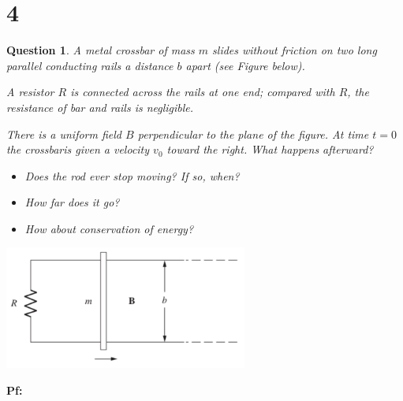 \documentclass{article}
\newtheorem{question}{Question}
\begin{document}
\section*{4}
\begin{myBox}[]{}
    \begin{question}
        A metal crossbar of mass $m$ slides without friction on two long
        parallel conducting rails a distance $b$ apart (see Figure below). 
        
        A resistor $R$ is connected across the rails at one end; compared with $R$, 
        the resistance of bar and rails is negligible. 
        
        There is a uniform field $B$ perpendicular to the plane of the figure. 
        At time $t = 0$ the crossbaris given a velocity $v_0$ toward the right. 
        What happens afterward?

        \begin{itemize}
            \item[(a)]Does the rod ever stop moving? If so, when?
            \item[(b)]How far does it go?
            \item[(c)] How about conservation of energy?
        \end{itemize}
    \end{question}

    \begin{center}
        \includegraphics*[width=80mm]{7.25.png}
    \end{center}
\end{myBox}

\textbf{Pf:}

\break
\end{document}
